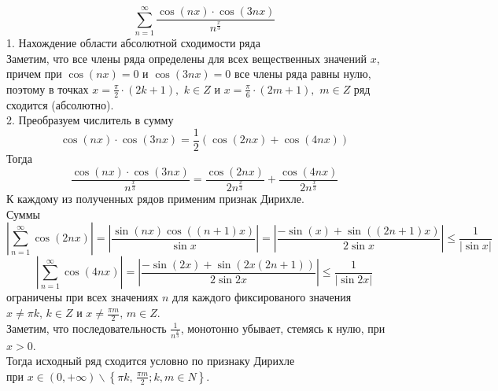 \documentclass[a5paper, 10pt]{article}
\theoremstyle{definition}
\theoremstyle{plain}
\theoremstyle{remark}
\begin{document}
\begin{equation}
\sum \limits_{n = 1}^{\infty}\frac{\cos( nx) \cdot \cos (3nx) }{n^{\frac{x}{3}}}
\end{equation}
1. Нахождение области абсолютной сходимости ряда\\

Заметим, что все члены ряда определены для всех вещественных значений $x$, причем при $\cos(nx) = 0$  и $\cos(3 nx) = 0$  все члены ряда равны нулю, поэтому \hypertarget{pdf}{в точках}  $x = \frac{\pi}{2} \cdot (2k + 1), \,\, k \in Z$  и $x = \frac{\pi}{6} \cdot (2m + 1), \,\, m \in Z$ ряд сходится (абсолютно).\\
2. Преобразуем числитель в сумму
\begin{equation*}
\cos( nx) \cdot \cos (3nx) = \frac{1}{2}\left( \cos(2nx) + \cos(4nx) \right)
\end{equation*}
Тогда
\begin{equation*}
\frac{\cos( nx) \cdot \cos (3nx) }{n^{\frac{x}{3}}} = \frac{\cos( 2nx) }{2n^{\frac{x}{3}}}+\frac{ \cos (4nx) }{2n^{\frac{x}{3}}}
\end{equation*}
К каждому из полученных рядов применим признак Дирихле.\\
Суммы 
\begin{equation*}
\left| \sum \limits_{n = 1}^{\infty} \cos( 2nx) \right| = \left| \frac{\sin (n x) \cos((n+1)x)}{\sin x} \right| =
 \left| \frac{-\sin (x) +  \sin((2n+1)x)}{2\sin x} \right| \leq \frac{1}{ \left|\sin x\right|}
\end{equation*}
\begin{equation*}
\left| \sum \limits_{n = 1}^{\infty} \cos( 4nx) \right| = \left| \frac{-\sin (2x) +  \sin(2x(2n+1))}{2\sin 2x} \right| \leq \frac{1}{ \left|\sin 2x\right|}
\end{equation*}
ограничены при всех значениях $n$ для каждого фиксированого значения $x \neq \pi k, \, k \in Z$ и $x \neq \frac{\pi m}{2}, \, m \in Z$.\\
Заметим, что  последовательность $\frac{1}{n^{\frac{x}{3}}}$, монотонно убывает, стемясь к нулю, при $x > 0$. \\
Тогда исходный ряд сходится условно по признаку Дирихле\\
 при $x \in (0, + \infty) \backslash \left\{\pi k, \, \frac{\pi m}{2};  k, m \in N \right\} $. \\
\end{document}
